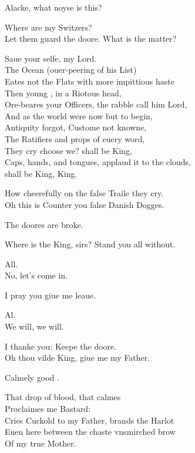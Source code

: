 \documentclass[a5paper,DIV=calc,11pt]{scrbook}
\begin{document}
\begin{drama*}
    \queenspeaks Alacke, what noyse is this?
    
    \kingspeaks Where are my Switzers?\\
    Let them guard the doore. What is the matter?
    
     Saue your selfe, my Lord.\\
    The Ocean (ouer-peering of his List)\\
    Eates not the Flats with more impittious haste\\
    Then young \laer, in a Riotous head,\\
    Ore-beares your Officers, the rabble call him Lord,\\
    And as the world were now but to begin,\\
    Antiquity forgot, Custome not knowne,\\
    The Ratifiers and props of euery word,\\
    They cry choose we? \laer shall be King,\\
    Caps, hands, and tongues, applaud it to the clouds,\\
    \laer shall be King, \laer King.
    
    \queenspeaks How cheerefully on the false Traile they cry.\\
    Oh this is Counter you false Danish Dogges.
    
    
    \kingspeaks The doores are broke.
    
    \laerspeaks Where is the King, sirs? Stand you all without.
    
    All.\\
    No, let's come in.
    
    \laerspeaks I pray you giue me leaue.
    
    Al.\\
    We will, we will.
    
    \laerspeaks I thanke you: Keepe the doore.\\
    Oh thou vilde King, giue me my Father.
    
    \queenspeaks Calmely good \laer.
    
    \laerspeaks That drop of blood, that calmes\\
    Proclaimes me Bastard:\\
    Cries Cuckold to my Father, brands the Harlot\\
    Euen here between the chaste vnsmirched brow\\
    Of my true Mother.
    

\end{drama*}
\end{document}
